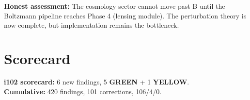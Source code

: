 \documentclass[11pt,a4paper]{article}
\theoremstyle{remark}
\newcommand{\GREEN}{\textcolor{dfdgreen}{\textbf{GREEN}}}
\newcommand{\YELLOW}{\textcolor{dfdred!70!black}{\textbf{YELLOW}}}
\begin{document}
\textbf{Honest assessment:} The cosmology sector cannot move past B until
the Boltzmann pipeline reaches Phase 4 (lensing module). The perturbation
theory is now complete, but implementation remains the bottleneck.

\section{Scorecard}

\textbf{i102 scorecard:} 6 new findings, 5 \GREEN{} + 1 \YELLOW{}.\\
\textbf{Cumulative:} 420 findings, 101 corrections, 106/4/0.
\end{document}
